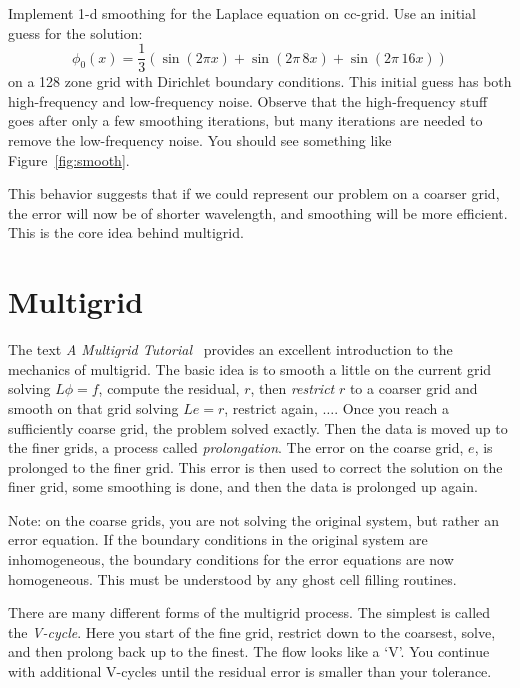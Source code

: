 \begin{exercise}
{Implement 1-d smoothing for the Laplace equation on
  cc-grid.  Use an initial guess for the solution:
  \begin{equation}
  \phi_0(x) = \frac{1}{3} ( \sin(2\pi x) + \sin(2\pi \, 8 x) + \sin(2\pi \, 16 x) )
  \end{equation}
  on a 128 zone grid with Dirichlet boundary conditions.  This initial
  guess has both high-frequency and low-frequency noise.  Observe that
  the high-frequency stuff goes after only a few smoothing iterations,
  but many iterations are needed to remove the low-frequency noise.
  You should see something like Figure~\ref{fig:smooth}.
}
\end{exercise}

This behavior suggests that if we could represent our
problem on a coarser grid, the error will now be of shorter
wavelength, and smoothing will be more efficient.  This is the core
idea behind multigrid.



\section{Multigrid}

The text {\em A Multigrid Tutorial}~\cite{multigridtutorial} provides
an excellent introduction to the mechanics of multigrid.  The basic
idea is to smooth a little on the current grid solving $L\phi = f$,
compute the residual, $r$, then {\em restrict} $r$ to a coarser grid and
smooth on that grid solving $Le = r$, restrict again, $\ldots$.  Once
you reach a sufficiently coarse grid, the problem solved exactly.
Then the data is moved up to the finer grids, a process called {\em
  prolongation}.  The error on the coarse grid, $e$, is prolonged to
the finer grid.  This error is then used to correct the solution on
the finer grid, some smoothing is done, and then the data is prolonged
up again.

Note: on the coarse grids, you are not solving the original system,
but rather an error equation.  If the boundary conditions in the
original system are inhomogeneous, the boundary conditions for the
error equations are now homogeneous.  This must be understood by
any ghost cell filling routines.

There are many different forms of the multigrid process.  The simplest 
is called the {\em V-cycle}.  Here you start of the fine grid, restrict
down to the coarsest, solve, and then prolong back up to the finest. 
The flow looks like a `V'.  You continue with additional V-cycles
until the residual error is smaller than your tolerance.

